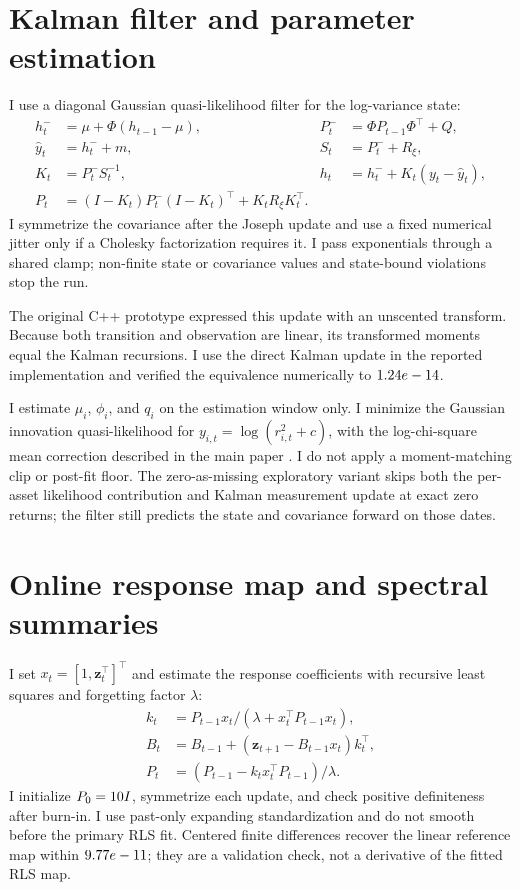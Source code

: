 \documentclass[11pt]{article}
\begin{document}
\section{Kalman filter and parameter estimation}
I use a diagonal Gaussian quasi-likelihood filter for the log-variance state:
\begin{align}
 h_t^- &= \mu+\Phi(h_{t-1}-\mu), & P_t^-&=\Phi P_{t-1}\Phi^\top+Q,\\
 \widehat y_t&=h_t^-+m, & S_t&=P_t^-+R_\xi,\\
 K_t&=P_t^-S_t^{-1}, & h_t&=h_t^-+K_t(y_t-\widehat y_t),\\
 P_t&=(I-K_t)P_t^-(I-K_t)^\top+K_tR_\xi K_t^\top.
\end{align}
I symmetrize the covariance after the Joseph update and use a fixed numerical jitter only if a Cholesky factorization requires it. I pass exponentials through a shared clamp; non-finite state or covariance values and state-bound violations stop the run.

The original C++ prototype expressed this update with an unscented transform. Because both transition and observation are linear, its transformed moments equal the Kalman recursions. I use the direct Kalman update in the reported implementation and verified the equivalence numerically to $1.24e-14$.

I estimate $\mu_i$, $\phi_i$, and $q_i$ on the estimation window only. I minimize the Gaussian innovation quasi-likelihood for $y_{i,t}=\log(r_{i,t}^2+c)$, with the log-chi-square mean correction described in the main paper \cite{HRS}. I do not apply a moment-matching clip or post-fit floor. The zero-as-missing exploratory variant skips both the per-asset likelihood contribution and Kalman measurement update at exact zero returns; the filter still predicts the state and covariance forward on those dates.

\section{Online response map and spectral summaries}
I set $x_t=[1,\mathbf z_t^\top]^\top$ and estimate the response coefficients with recursive least squares and forgetting factor $\lambda$:
\begin{align}
 k_t&=P_{t-1}x_t/(\lambda+x_t^\top P_{t-1}x_t),\\
 B_t&=B_{t-1}+(\mathbf z_{t+1}-B_{t-1}x_t)k_t^\top,\\
 P_t&=(P_{t-1}-k_tx_t^\top P_{t-1})/\lambda.
\end{align}
I initialize $P_0=10{}I$, symmetrize each update, and check positive definiteness after burn-in. I use past-only expanding standardization and do not smooth before the primary RLS fit. Centered finite differences recover the linear reference map within $9.77e-11$; they are a validation check, not a derivative of the fitted RLS map.
\end{document}
